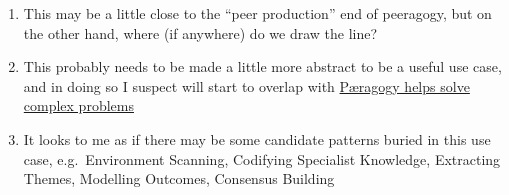 \begin{enumerate}
\item
  This may be a little close to the ``peer production'' end of
  peeragogy, but on the other hand, where (if anywhere) do we draw the
  line?
\item
  This probably needs to be made a little more abstract to be a useful
  use case, and in doing so I suspect will start to overlap with
  \href{http://socialmediaclassroom.com/host/peeragogy/forum/patterns-and-use-cases\#comment-1509}{Pæragogy
  helps solve complex problems}
\item
  It looks to me as if there may be some candidate patterns buried in
  this use case, e.g.~Environment Scanning, Codifying Specialist
  Knowledge, Extracting Themes, Modelling Outcomes, Consensus Building
\end{enumerate}
